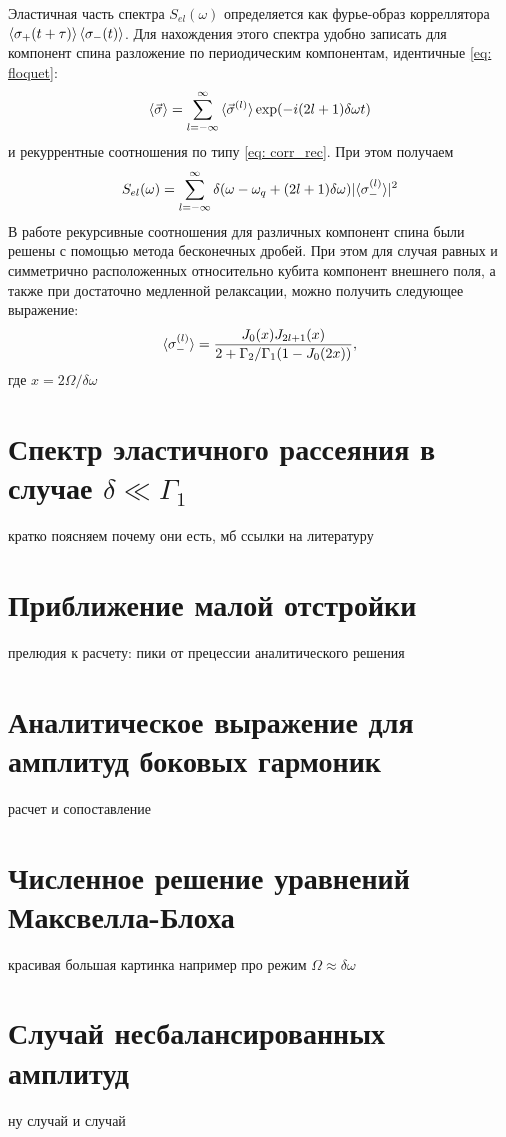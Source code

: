Эластичная часть спектра $S_{el}(\omega)$ определяется как фурье-образ корреллятора $\braket{\sigma_+(t+\tau)}\braket{\sigma_-(t)}$. Для нахождения этого спектра удобно записать для компонент спина разложение по периодическим компонентам, идентичные \eqref{eq: floquet}:
\begin{equation}
\braket{\vec{\sigma}}  = \sum_{l=-\infty}^{\infty}\braket{\vec{\sigma}^{(l)}}\exp(-i(2l+1)\delta\omega t)
\end{equation} и рекуррентные соотношения по типу \eqref{eq: corr_rec}. При этом получаем
\begin{equation}
S_{el}(\omega) = \sum_{l=-\infty}^{\infty}\delta(\omega-\omega_q+(2l+1)\delta\omega)|\!\braket{\sigma_-^{(l)}}\!|^2
\end{equation}
В работе \cite{Ryuten} рекурсивные соотношения для различных компонент спина были решены с помощью метода бесконечных дробей. При этом для случая равных и симметрично расположенных относительно кубита компонент внешнего поля, а также при достаточно медленной релаксации, можно получить следующее выражение:
\begin{equation}
\braket{\sigma_-^{(l)}} = \frac{J_0(x)J_{2l+1}(x)}{2+\Gamma_2/\Gamma_1(1-J_0(2x))},
\end{equation}
где $x=2\Omega/\delta\omega$
\section{Спектр эластичного рассеяния в случае $\delta \ll \Gamma_1$}
кратко поясняем почему они есть, мб ссылки на литературу
\section{Приближение малой отстройки}
прелюдия к расчету: пики от прецессии аналитического решения
\section{Аналитическое выражение для амплитуд боковых гармоник}
расчет и сопоставление
\section{Численное решение уравнений Максвелла-Блоха}
красивая большая картинка например про режим $\Omega \approx \delta \omega$
\section{Случай несбалансированных амплитуд}
 ну случай и случай